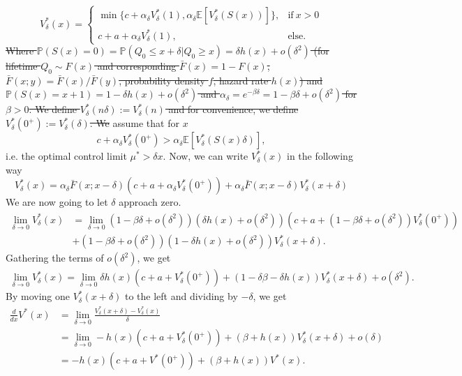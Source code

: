 \documentclass[a4paper]{thesis}
\theoremstyle{definition}
\providecommand{\DIFaddtex}[1]{{\protect\color{blue}\uwave{#1}}} %
\providecommand{\DIFdeltex}[1]{{\protect\color{red}\sout{#1}}}                      %
\providecommand{\DIFaddbegin}{} %
\providecommand{\DIFaddend}{} %
\providecommand{\DIFdelbegin}{} %
\providecommand{\DIFdelend}{} %
\providecommand{\DIFadd}[1]{\texorpdfstring{\DIFaddtex{#1}}{#1}} %
\providecommand{\DIFdel}[1]{\texorpdfstring{\DIFdeltex{#1}}{}} %
\newcommand{\DIFscaledelfig}{0.5}
\newlength{\DIFdelgraphicswidth} %
\newlength{\DIFdelgraphicsheight} %
\newcommand{\DIFaddincludegraphics}[2][]{{\color{blue}\fbox{\DIFOincludegraphics[#1]{#2}}}} %
\newcommand{\DIFdelincludegraphics}[2][]{%
	\sbox{\DIFdelgraphicsbox}{\DIFOincludegraphics[#1]{#2}}%
	\settoboxwidth{\DIFdelgraphicswidth}{\DIFdelgraphicsbox} %
	\settoboxtotalheight{\DIFdelgraphicsheight}{\DIFdelgraphicsbox} %
	\scalebox{\DIFscaledelfig}{%
		\parbox[b]{\DIFdelgraphicswidth}{\usebox{\DIFdelgraphicsbox}\\[-\baselineskip] \rule{\DIFdelgraphicswidth}{0em}}\llap{\resizebox{\DIFdelgraphicswidth}{\DIFdelgraphicsheight}{%
				\setlength{\unitlength}{\DIFdelgraphicswidth}%
				\begin{picture}(1,1)%
				\thicklines\linethickness{2pt} %
				{\color[rgb]{1,0,0}\put(0,0){\framebox(1,1){}}}%
				{\color[rgb]{1,0,0}\put(0,0){\line( 1,1){1}}}%
				{\color[rgb]{1,0,0}\put(0,1){\line(1,-1){1}}}%
				\end{picture}%
			}\hspace*{3pt}}} %
} %
\DeclareRobustCommand{\DIFaddbegin}{\DIFOaddbegin \let\includegraphics\DIFaddincludegraphics} %
\DeclareRobustCommand{\DIFaddend}{\DIFOaddend \let\includegraphics\DIFOincludegraphics} %
\DeclareRobustCommand{\DIFdelbegin}{\DIFOdelbegin \let\includegraphics\DIFdelincludegraphics} %
\DeclareRobustCommand{\DIFdelend}{\DIFOaddend \let\includegraphics\DIFOincludegraphics} %
\begin{document}
	\[V_\delta^*(x)=\begin{cases}
	\min\{c+\alpha_\delta V^*_\delta(1),\alpha_\delta \mathbb{E}[V^*_\delta(S(x))]\},&\text{if}\ x>0 \\
	c+a+\alpha_\delta V^*_\delta(1),&\text{else.}
	\end{cases}\]
	\DIFdelbegin \DIFdel{Where $\mathbb{P}(S(x)=0)=\mathbb{P}(Q_0\leq x+\delta|Q_0\geq x)=\delta h(x)+o(\delta^2)$ (for lifetime $Q_0\sim F(x)$ and corresponding $\bar F(x)=1-F(x)$, $\bar F(x;y)=\bar F(x)/\bar F(y)$, probability density $f$, hazard rate $h(x)$) and $\mathbb{P}(S(x)=x+1)=1-\delta h(x)+o(\delta^2)$ and $\alpha_\delta=e^{-\beta \delta}=1-\beta \delta + o(\delta^2)$ for $\beta>0$.
		We define $V^*_\delta(n\delta):=V^*_\delta(n)$ and for convenience, we define $V^*_\delta(0^+):=V^*_\delta(\delta)$.
		We }\DIFdelend \DIFaddbegin \DIFadd{We }\DIFaddend assume that for $x$
	$$
	c+\alpha_\delta V^*_\delta(0^+)>\alpha_\delta \mathbb{E}[V^*_\delta(S(x)\delta)],
	$$
	i.e. the optimal control limit $\mu^*>\delta x$.
	Now, we can write $V^*_\delta(x)$ in the following way
	\[V^*_\delta(x)=\alpha_\delta \bar F(x;x-\delta) (c+a+\alpha_\delta V^*_\delta(0^+))
	+\alpha_\delta \bar F(x;x-\delta)V^*_\delta(x+\delta)
	\]
	We are now going to let $\delta$ approach zero.
	\begin{equation}
	\begin{split}
	\lim\limits_{\delta\rightarrow 0} V_\delta^*(x) &=
	\lim\limits_{\delta\rightarrow 0}(1-\beta\delta+o(\delta^2)) (\delta h(x)+o(\delta^2))(c+a+(1-\beta\delta+o(\delta^2)) V^*_\delta(0^+))\\
	&+(1-\beta\delta+o(\delta^2)) (1-\delta h(x)+o(\delta^2))V_\delta^*(x+\delta).
	\end{split}
	\end{equation}
	Gathering the terms of $o(\delta^2)$, we get
	\begin{equation}\label{eq:gatheredDelta}
	\begin{split}
	\lim\limits_{\delta\rightarrow 0} V_\delta^*(x) =
	\lim\limits_{\delta\rightarrow 0}\delta h(x)(c+a+ V_\delta^*(0^+))+(1-\delta\beta-\delta h(x)) V_\delta^*(x+\delta)+o(\delta^2).
	\end{split}
	\end{equation}
	By moving one $V_\delta^*(x+\delta)$ to the left and dividing by $-\delta$, we get
	\begin{equation}\label{eq:AgeBasedBellmanODE}
	\begin{split}
	\frac{d}{dx}V^*(x)&=\lim\limits_{\delta\rightarrow 0} \frac{V_\delta^*(x+\delta)-V_\delta^*(x)}{\delta} \\
	&=\lim\limits_{\delta\rightarrow 0} -h(x)(c+a+ V_\delta^*(0^+))+(\beta+ h(x)) V_\delta^*(x+\delta)+o(\delta)\\
	&=-h(x)(c+a+ V^*(0^+))+(\beta+ h(x)) V^*(x).
	\end{split}
	\end{equation}
\end{document}

